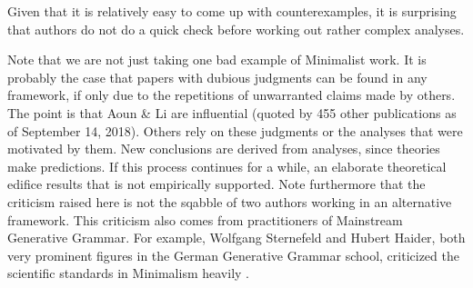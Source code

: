 \documentclass[output=paper
                ,modfonts
                ,nonflat
	        ,collection
	        ,collectionchapter
	        ,collectiontoclongg
 	        ,biblatex
                ,babelshorthands
                ,newtxmath
                ,draftmode
                ,colorlinks, citecolor=brown
]{./langsci/langscibook}
\begin{document}
\zl
%
Given that it is relatively easy to come up with counterexamples, it is surprising that authors do
not do a quick check before working out rather complex analyses.

Note that we are not just taking one bad example of Minimalist work. It is probably the case that
papers with dubious judgments can be found in any framework, if only due to the repetitions
of unwarranted claims made by others. The point is that Aoun \& Li are influential (quoted by 455
other publications as of September 14, 2018). Others rely on these judgments or the analyses that were
motivated by them. New conclusions are derived from analyses, since theories make predictions. If
this process continues for a while, an elaborate theoretical edifice results that is not
empirically supported. Note furthermore that the criticism raised here is not the sqabble of two
authors working in an alternative framework. This criticism also comes from practitioners of
Mainstream Generative Grammar. For example, Wolfgang Sternefeld and Hubert Haider, both very
prominent figures in the German Generative Grammar school, criticized the scientific standards in
Minimalism heavily \citep{%
SR2012a,Haider2018a}. 
\end{document}
